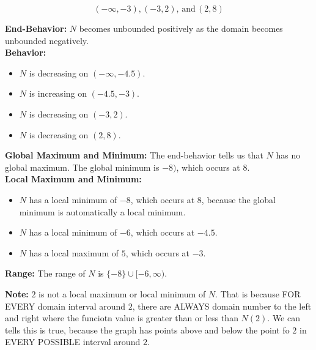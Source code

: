 \documentclass{ximera}
\begin{document}
\begin{example}
\[
(-\infty, -3), (-3, 2), \, \text{and} \, (2, 8)
\]


\textbf{End-Behavior:}  $N$ becomes unbounded positively as the domain becomes unbounded negatively.\\

\textbf{Behavior:}  

\begin{itemize}
	\item $N$ is decreasing on $(-\infty, -4.5)$.
	\item $N$ is increasing on $(-4.5, -3)$.
	\item $N$ is decreasing on $(-3, 2)$.
	\item $N$ is decreasing on $(2, 8)$.
\end{itemize}



\textbf{Global Maximum and Minimum:} The end-behavior tells us that $N$ has no global maximum.  The global minimum is $-8)$, which occurs at $8$.  \\


\textbf{Local Maximum and Minimum:} 

\begin{itemize}
	\item $N$ has a local minimum of $-8$, which occurs at $8$, because the global minimum is automatically a local minimum.
	\item $N$ has a local minimum of $-6$, which occurs at $-4.5$.
	\item $N$ has a local maximum of $5$, which occurs at $-3$.

\end{itemize}

\textbf{Range:} The range of $N$ is $\{ -8 \} \cup [-6, \infty)$. \\ 


\end{example}


\textbf{Note:} $2$ is not a local maximum or local minimum of $N$.  That is because FOR EVERY domain interval around $2$, there are ALWAYS domain number to the left and right where the funciotn value is greater than or less than $N(2)$.  We can tells this is true, because the graph has points above and below the point fo $2$ in EVERY POSSIBLE interval around $2$. \\
\end{document}
